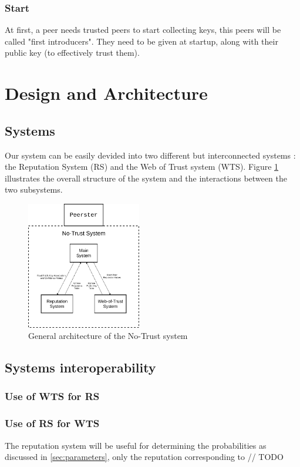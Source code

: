 \documentclass[]{article}
\begin{document}
\subsubsection{Start}
At first, a peer needs trusted peers to start collecting keys, this peers will be called "first introducers". They need to be given at startup, along with their public key (to effectively trust them).

\section{Design and Architecture}

\subsection{Systems}
Our system can be easily devided into two different but interconnected systems : the Reputation System (RS) and the Web of Trust system (WTS). \newline
Figure \ref{fig:no-trust-arch} illustrates the overall structure of the system and the interactions between the two subsystems.

\begin{figure}[h]
	\includegraphics[width=50mm]{no-trust-arch}
	\centering
	\caption{General architecture of the No-Trust system}
	\label{fig:no-trust-arch}
\end{figure}

\subsection{Systems interoperability}

\subsubsection{Use of WTS for RS}

\subsubsection{Use of RS for WTS}
The reputation system will be useful for determining the probabilities as discussed in \ref{sec:parameters}, only the reputation corresponding to // TODO
\end{document}
